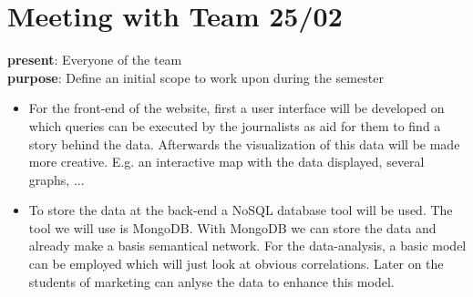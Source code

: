 \section{Meeting with Team 25/02}
{\bf present}: Everyone of the team\\
{\bf purpose}: Define an initial scope to work upon during the semester
\begin{itemize}
\item For the front-end of the website, first a user interface will be developed on which queries can be executed by the journalists as aid for them to find a story behind the data. Afterwards the visualization of this data will be made more creative. E.g. an interactive map with the data displayed, several graphs, ...
\item To store the data at the back-end a NoSQL database tool will be used. The tool we will use is MongoDB. With MongoDB we can store the data and already make a basis semantical network. For the data-analysis, a basic model can be employed which will just look at obvious correlations. Later on the students of marketing can anlyse the data to enhance this model.
\end{itemize}